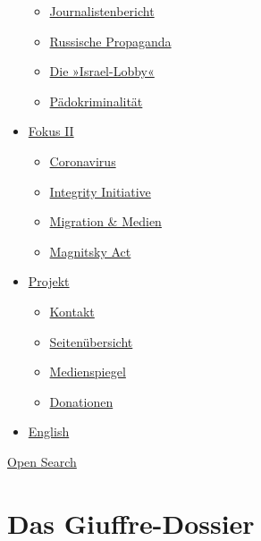 \begin{itemize}
  \begin{itemize}
  \tightlist
  \item
    \href{https://swprs.org/bericht-eines-journalisten/}{Journalistenbericht}
  \item
    \href{https://swprs.org/russische-propaganda/}{Russische Propaganda}
  \item
    \href{https://swprs.org/die-israel-lobby-fakten-und-mythen/}{Die
    »Israel-Lobby«}
  \item
    \href{https://swprs.org/geopolitik-und-paedokriminalitaet/}{Pädokriminalität}
  \end{itemize}
\item
  \href{https://swprs.org/migration-und-medien/}{Fokus II}

  \begin{itemize}
  \tightlist
  \item
    \href{https://swprs.org/covid-19-hinweis-ii/}{Coronavirus}
  \item
    \href{https://swprs.org/die-integrity-initiative/}{Integrity
    Initiative}
  \item
    \href{https://swprs.org/migration-und-medien/}{Migration \& Medien}
  \item
    \href{https://swprs.org/der-fall-magnitsky/}{Magnitsky Act}
  \end{itemize}
\item
  \href{https://swprs.org/kontakt/}{Projekt}

  \begin{itemize}
  \tightlist
  \item
    \href{https://swprs.org/kontakt/}{Kontakt}
  \item
    \href{https://swprs.org/uebersicht/}{Seitenübersicht}
  \item
    \href{https://swprs.org/medienspiegel/}{Medienspiegel}
  \item
    \href{https://swprs.org/donationen/}{Donationen}
  \end{itemize}
\item
  \href{https://swprs.org/contact/}{English}
\end{itemize}

\protect\hyperlink{}{Open Search}

\hypertarget{das-giuffre-dossier}{%
\section{Das Giuffre-Dossier}\label{das-giuffre-dossier}}

